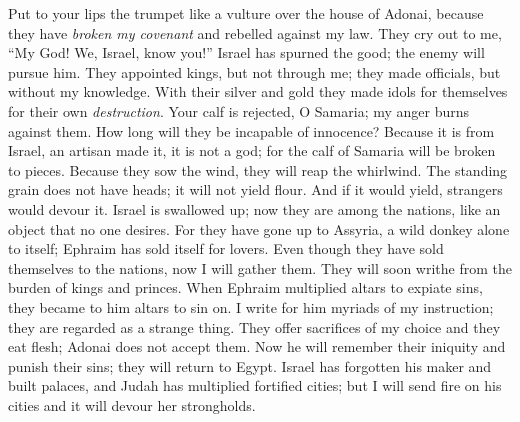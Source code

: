 \begin{biblechapter} %
 Put to your lips the trumpet 
like a vulture over the house of Adonai, 
because they have \textit{broken my covenant} 
and rebelled against my law.
\verse They cry out to me, 
“My God! We, Israel, know you!”
\verse Israel has spurned the good; 
the enemy will pursue him.
\verse They appointed kings, but not through me; 
they made officials, but without my knowledge. 
With their silver and gold 
they made idols for themselves 
for their own \textit{destruction}.
\verse Your calf is rejected, O Samaria; 
my anger burns against them. 
How long will they be incapable of innocence?
\verse Because it is from Israel, 
an artisan made it, 
it is not a god; 
for the calf of Samaria 
will be broken to pieces.
\verse Because they sow the wind, 
they will reap the whirlwind. 
The standing grain does not have heads; 
it will not yield flour. 
And if it would yield, 
strangers would devour it.
\verse Israel is swallowed up; 
now they are among the nations, 
like an object that no one desires.
\verse For they have gone up to Assyria, 
a wild donkey alone to itself; 
Ephraim has sold itself for lovers.
\verse Even though they have sold themselves to the nations, 
now I will gather them. 
They will soon writhe 
from the burden of kings and princes.
\verse When Ephraim multiplied altars 
to expiate sins, 
they became to him altars to sin on.
\verse I write for him myriads of my instruction; 
they are regarded as a strange thing.
\verse They offer sacrifices of my choice 
and they eat flesh; 
Adonai does not accept them. 
Now he will remember their iniquity 
and punish their sins; 
they will return to Egypt.
\verse Israel has forgotten his maker and built palaces, 
and Judah has multiplied fortified cities; 
but I will send fire on his cities 
and it will devour her strongholds.
\end{biblechapter}

